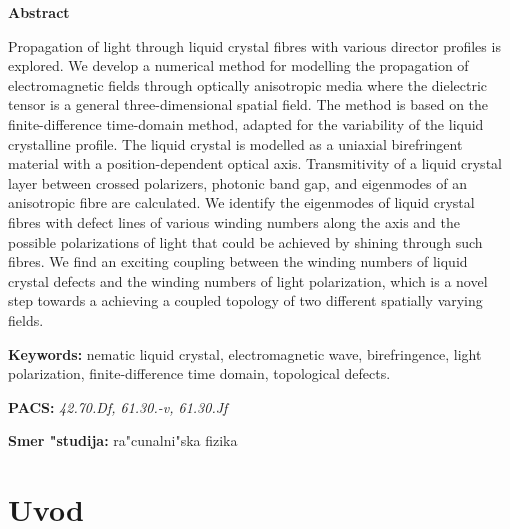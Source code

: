 \documentclass[12pt,twoside,openright,final]{report}
\begin{document}
\bigskip
\bigskip

\vfill
\centerline{\bf Abstract}
\bigskip
\noindent

Propagation of light through liquid crystal fibres with various director profiles is explored. 
We develop a numerical method for modelling the propagation of electromagnetic fields through optically anisotropic media where the dielectric tensor is a general three-dimensional spatial field. 
The method is based on the finite-difference time-domain method, adapted for the variability of the liquid crystalline profile. 
The liquid crystal is modelled as a uniaxial birefringent material with a position-dependent optical axis. 
Transmitivity of a liquid crystal layer between crossed polarizers, photonic band gap, and eigenmodes of an anisotropic fibre are calculated. 
We identify the eigenmodes of liquid crystal fibres with defect lines of various winding numbers along the axis and the possible polarizations of light that could be achieved by shining through such fibres. 
We find an exciting coupling between the winding numbers of liquid crystal defects and the winding numbers of light polarization, which is a novel step towards a achieving a coupled topology of two different spatially varying fields.   

\bigskip
\noindent
{\bf Keywords:} nematic liquid crystal, electromagnetic wave, birefringence, light polarization, finite-difference time domain, topological defects.

\bigskip
\vfill

\noindent
{\bf PACS:} \textit{
42.70.Df, %
61.30.-v, %
61.30.Jf %
}

\bigskip
\vfill

\noindent
{\bf Smer "studija:} ra"cunalni"ska fizika
\vfill

\newpage
\thispagestyle{empty}

\tableofcontents

\chapter{Uvod} %
\end{document}
